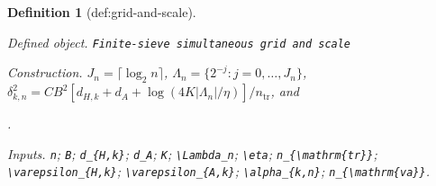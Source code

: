 \documentclass{article}
\newtheorem{definition}{Definition}
\begin{document}
\begin{definition}[def:grid-and-scale]\label{def:grid-and-scale}
\par\smallskip\noindent\emph{Defined object.} \texttt{Finite-\allowbreak{}sieve simultaneous grid and scale}
\par\smallskip\noindent\emph{Construction.} \(J_n=\lceil\log_2 n\rceil\), \(\Lambda_n=\{2^{-j}:j=0,\ldots,J_n\}\), \(\delta_{k,n}^2=C B^2[d_{H,k}+d_A+\log(4K|\Lambda_n|/\eta)]/n_{\mathrm{tr}}\), and \par\noindent {}\par\noindent.
\par\smallskip\noindent\emph{Inputs.} \texttt{n}; \texttt{B}; \texttt{d\_\allowbreak{}\{H,\allowbreak{}k\}\allowbreak{}}; \texttt{d\_\allowbreak{}A}; \texttt{K}; \texttt{\textbackslash{}\allowbreak{}Lambda\_\allowbreak{}n}; \texttt{\textbackslash{}\allowbreak{}eta}; \texttt{n\_\allowbreak{}\{\textbackslash{}\allowbreak{}mathrm\{tr\}\allowbreak{}\}\allowbreak{}}; \texttt{\textbackslash{}\allowbreak{}varepsilon\_\allowbreak{}\{H,\allowbreak{}k\}\allowbreak{}}; \texttt{\textbackslash{}\allowbreak{}varepsilon\_\allowbreak{}\{A,\allowbreak{}k\}\allowbreak{}}; \texttt{\textbackslash{}\allowbreak{}alpha\_\allowbreak{}\{k,\allowbreak{}n\}\allowbreak{}}; \texttt{n\_\allowbreak{}\{\textbackslash{}\allowbreak{}mathrm\{va\}\allowbreak{}\}\allowbreak{}}.
\end{definition}
\end{document}
